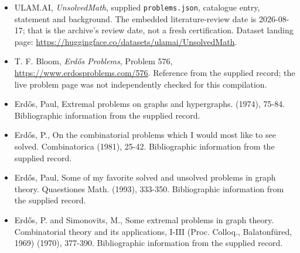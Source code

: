 \documentclass[11pt,a4paper]{article}
\begin{document}
{\small

\begin{itemize}

\item[\hypertarget{source:statement:1}{S1}] ULAM.AI, \emph{UnsolvedMath}, supplied \texttt{problems.json}, catalogue entry, statement and background. The embedded literature-review date is 2026-08-17; that is the archive’s review date, not a fresh certification. Dataset landing page: \url{https://huggingface.co/datasets/ulamai/UnsolvedMath}.

\item[\hypertarget{source:statement:2}{S2}] T. F. Bloom, \emph{Erdős Problems}, Problem 576, \url{https://www.erdosproblems.com/576}. Reference from the supplied record; the live problem page was not independently checked for this compilation.

\item[\hypertarget{source:statement:3}{S3}] Erd\H{o}s, Paul, Extremal problems on graphs and hypergraphs. (1974), 75-84. Bibliographic information from the supplied record.

\item[\hypertarget{source:statement:4}{S4}] Erd\H{o}s, P., On the combinatorial problems which I would most like to see solved. Combinatorica (1981), 25-42. Bibliographic information from the supplied record.

\item[\hypertarget{source:statement:5}{S5}] Erd\H{o}s, Paul, Some of my favorite solved and unsolved problems in graph theory. Quaestiones Math. (1993), 333-350. Bibliographic information from the supplied record.

\item[\hypertarget{source:statement:6}{S6}] Erd\H{o}s, P. and Simonovits, M., Some extremal problems in graph theory. Combinatorial theory and its applications, I-III (Proc. Colloq., Balatonf\"{u}red, 1969) (1970), 377-390. Bibliographic information from the supplied record.

\end{itemize}

}

\label{end:statement}
\end{document}
